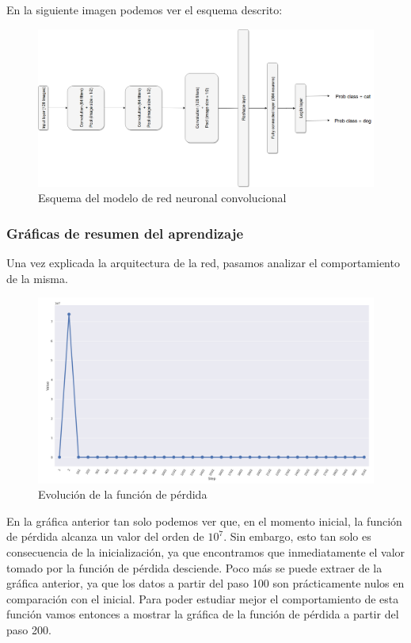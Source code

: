 \documentclass[11pt]{article}
\theoremstyle{plain}
\theoremstyle{definition}
\begin{document}
En la siguiente imagen podemos ver el esquema descrito:

\begin{figure}[H]
  \centering \includegraphics[width=1\textwidth]{imgs/adam_model.png}
  \caption{Esquema del modelo de red neuronal convolucional}
\end{figure}




\subsubsection{Gráficas de resumen del aprendizaje}

Una vez explicada la arquitectura de la red, pasamos analizar el 
comportamiento de la misma.


\begin{figure}[H]
  \centering \includegraphics[width=.95\textwidth]{imgs/loss_adam_1}
  \caption{Evolución de la función de pérdida}
\end{figure}


En la gráfica anterior tan solo podemos ver que, en el momento inicial,
la función de pérdida alcanza un valor del orden de $10^7$. Sin embargo,
esto tan solo es consecuencia de la inicialización, ya que encontramos 
que inmediatamente el valor tomado por la función de pérdida desciende.
Poco más se puede extraer de la gráfica anterior, ya que los datos 
a partir del paso 100 son prácticamente nulos en comparación con el 
inicial. Para poder estudiar mejor el comportamiento de esta función 
vamos entonces a mostrar la gráfica de la función de pérdida a partir
del paso 200.
\end{document}
